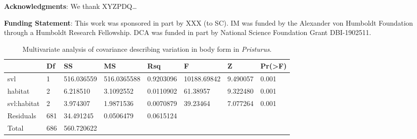 \documentclass[
  11pt,
]{article}
\begin{document}
\textbf{Acknowledgments}: We thank XYZPDQ\ldots{}

\textbf{Funding Statement}: This work was sponsored in part by XXX (to
SC). IM was funded by the Alexander von Humboldt Foundation through a
Humboldt Research Fellowship. DCA was funded in part by National Science
Foundation Grant DBI-1902511.

\newpage

\begin{table}[H]

\caption{\label{tab:unnamed-chunk-1}Multivariate analysis of covariance describing variation in body form in \textit{Pristurus}.}
\centering
\begin{tabular}[t]{llllllll}
\toprule
  & Df & SS & MS & Rsq & F & Z & Pr(>F)\\
\midrule
svl & 1 & 516.036559 & 516.0365588 & 0.9203096 & 10188.69842 & 9.490057 & 0.001\\
habitat & 2 & 6.218510 & 3.1092552 & 0.0110902 & 61.38957 & 9.322480 & 0.001\\
svl:habitat & 2 & 3.974307 & 1.9871536 & 0.0070879 & 39.23464 & 7.077264 & 0.001\\
Residuals & 681 & 34.491245 & 0.0506479 & 0.0615124 &  &  & \\
Total & 686 & 560.720622 &  &  &  &  & \\
\bottomrule
\end{tabular}
\end{table}

\newpage
\end{document}
